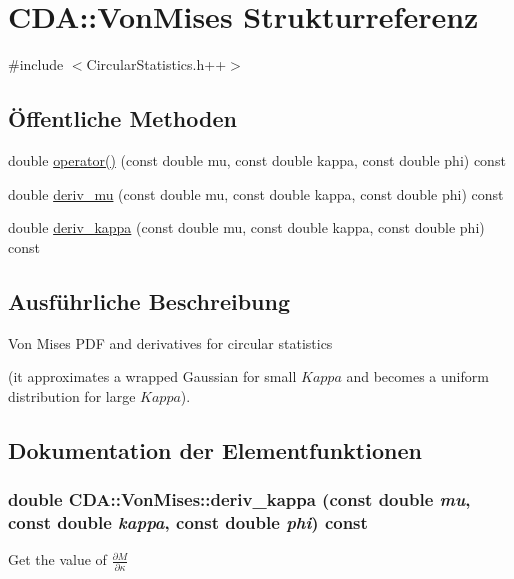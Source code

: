 \hypertarget{structCDA_1_1VonMises}{
\section{CDA::VonMises Strukturreferenz}
\label{structCDA_1_1VonMises}
}


{\ttfamily \#include $<$CircularStatistics.h++$>$}

\subsection*{Öffentliche Methoden}
\begin{DoxyCompactItemize}
\item 
double \hyperlink{structCDA_1_1VonMises_a85bd82b40dd422b2c044bb31bbaede58}{operator()} (const double mu, const double kappa, const double phi) const 
\item 
double \hyperlink{structCDA_1_1VonMises_a3ea11829bbcebe3dbfc174deda47cf9f}{deriv\_\-mu} (const double mu, const double kappa, const double phi) const 
\item 
double \hyperlink{structCDA_1_1VonMises_a392aea12f3aa6fc317342e92353783f9}{deriv\_\-kappa} (const double mu, const double kappa, const double phi) const 
\end{DoxyCompactItemize}


\subsection{Ausführliche Beschreibung}
Von Mises PDF and derivatives for circular statistics

(it approximates a wrapped Gaussian for small $Kappa$ and becomes a uniform distribution for large $Kappa$). 

\subsection{Dokumentation der Elementfunktionen}
\hypertarget{structCDA_1_1VonMises_a392aea12f3aa6fc317342e92353783f9}{
\subsubsection[{deriv\_\-kappa}]{\setlength{\rightskip}{0pt plus 5cm}double CDA::VonMises::deriv\_\-kappa (const double {\em mu}, \/  const double {\em kappa}, \/  const double {\em phi}) const}}
\label{structCDA_1_1VonMises_a392aea12f3aa6fc317342e92353783f9}
Get the value of $\frac{\partial M}{\partial \kappa}$

